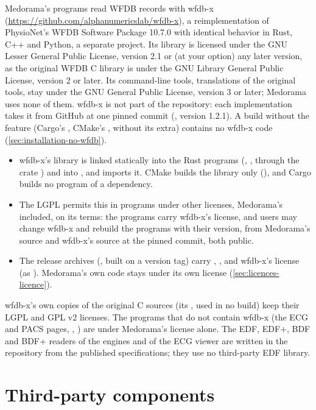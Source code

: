Medorama's programs read WFDB records with wfdb-x
(\url{https://github.com/alphanumericslab/wfdb-x}), a reimplementation of PhysioNet's WFDB
Software Package 10.7.0 with identical behavior in Rust, C++ and Python, a separate project.
Its library is licensed under the GNU Lesser General Public License, version 2.1 or (at your
option) any later version, as the original WFDB C library is under the GNU Library General
Public License, version 2 or later. Its command-line tools, translations of the original tools,
stay under the GNU General Public License, version 3 or later; Medorama uses none of them. wfdb-x
is not part of the repository: each implementation takes it from GitHub at one pinned commit
(, version 1.2.1). A build without the  feature (Cargo's
, CMake's ,  without its
\code{[wfdb]} extra) contains no wfdb-x code (\cref{sec:installation-no-wfdb}).
\begin{itemize}
\item wfdb-x's library is linked statically into the Rust programs (,
  , through the crate ) and into
  , and  imports it. CMake builds the library only
  (), and Cargo builds no program of a dependency.
\item The LGPL permits this in programs under other licenses, Medorama's included, on its terms:
  the programs carry wfdb-x's license, and users may change wfdb-x and rebuild the programs with
  their version, from Medorama's source and wfdb-x's source at the pinned commit, both public.
\item The release archives (, built on a version tag) carry
  , ,  and wfdb-x's license (as
  ). Medorama's own code stays under its own license
  (\cref{sec:licences-licence}).
\end{itemize}
wfdb-x's own copies of the original C sources (its , used in no build) keep
their LGPL and GPL v2 licenses. The programs that do not contain wfdb-x (the ECG and PACS pages,
, ) are under Medorama's license alone. The EDF, EDF+, BDF and BDF+
readers of the engines and of the ECG viewer are written in the repository from the published
specifications; they use no third-party EDF library.

\section{Third-party components}
\label{sec:licences-third-party}

